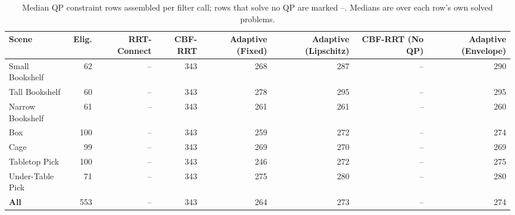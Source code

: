\begin{table}[t]
  \centering
  \caption{Median QP constraint rows assembled per filter call; rows that solve no QP are marked --. Medians are over each row's own solved problems.}
  \label{tab:mbm-per-scene-qprows}
  \small
  \begin{tabular}{lrrrrrrr}
    \toprule
    Scene & Elig. & RRT-Connect & CBF-RRT & Adaptive (Fixed) & Adaptive (Lipschitz) & CBF-RRT (No QP) & Adaptive (Envelope) \\
    \midrule
    Small Bookshelf & 62 & -- & 343 & 268 & 287 & -- & 290 \\
    Tall Bookshelf & 60 & -- & 343 & 278 & 295 & -- & 295 \\
    Narrow Bookshelf & 61 & -- & 343 & 261 & 261 & -- & 260 \\
    Box & 100 & -- & 343 & 259 & 272 & -- & 274 \\
    Cage & 99 & -- & 343 & 269 & 270 & -- & 269 \\
    Tabletop Pick & 100 & -- & 343 & 246 & 272 & -- & 275 \\
    Under-Table Pick & 71 & -- & 343 & 275 & 280 & -- & 280 \\
    \midrule
    \textbf{All} & 553 & -- & 343 & 264 & 273 & -- & 274 \\
    \bottomrule
  \end{tabular}
\end{table}
